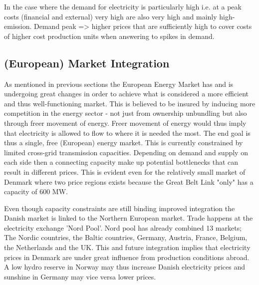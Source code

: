 In the case where the demand for electricity is particularly high i.e. at a peak costs (financial and external) very high are also very high and mainly high-emission. Demand peak => higher prices that are sufficiently high to cover costs of higher cost production units
when answering to spikes in demand.




\subsection{(European) Market Integration}
\label{subsec:t_EU}
As mentioned in previous sections the European Energy Market has and is undergoing great changes in order to achieve what is considered a more efficient and thus well-functioning market. This is believed to be insured by inducing more competition in the energy sector - not just from ownership unbundling but also through freer movement of energy. Freer movement of energy would thus imply that electricity is allowed to flow to where it is needed the most. The end goal is thus a single, free (European) energy market. This is currently constrained by limited cross-grid transmission capacities. Depending on demand and supply on each side then a connecting capacity make up potential bottlenecks that can result in different prices.%
This is evident even for the relatively small market of Denmark where two price regions exists because the Great Belt Link "only" has a capacity of 600 MW.
\par
Even though capacity constraints are still binding improved integration the Danish market is linked to the Northern European market. Trade happens at the electricity exchange 'Nord Pool'. Nord pool has already combined 13 markets; The Nordic countries, the Baltic countries, Germany, Austria, France, Belgium, the Netherlands and the UK.  This and future integration implies that electricity prices in Denmark are under great influence from production conditions abroad. A low hydro reserve in Norway may thus increase Danish electricity prices and sunshine in Germany may vice versa lower prices.
\par

